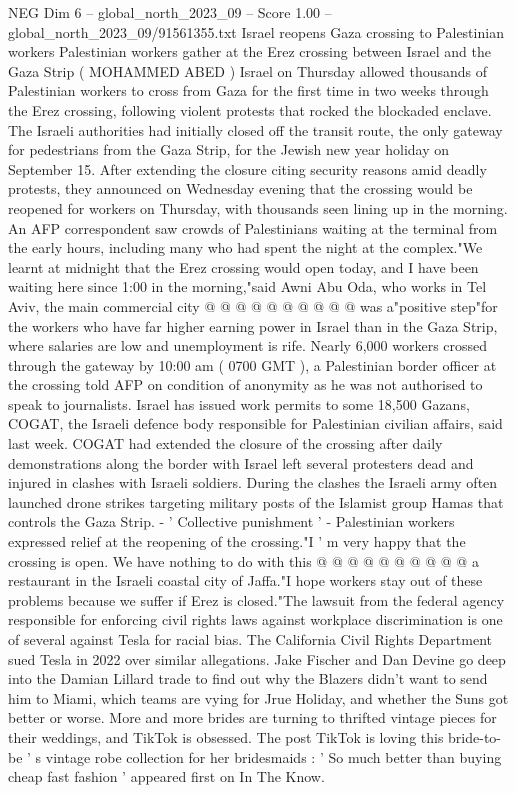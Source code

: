 \begin{textsample}{NEG Dim 6 – global\_north\_2023\_09 – Score 1.00 – global\_north\_2023\_09/91561355.txt}  \label{ex:f6_neg_377}
Israel reopens Gaza crossing to Palestinian workers Palestinian workers gather at the Erez crossing between Israel and the Gaza Strip ( MOHAMMED ABED ) Israel on Thursday allowed thousands of Palestinian workers to cross from Gaza for the first time in two weeks through the Erez crossing, following violent protests that rocked the blockaded enclave.
The Israeli authorities had initially closed off the transit route, the only gateway for pedestrians from the Gaza Strip, for the Jewish new year holiday on September 15.
After extending the closure citing security reasons amid deadly protests, they announced on Wednesday evening that the crossing would be reopened for workers on Thursday, with thousands seen lining up in the morning.
An AFP correspondent saw crowds of Palestinians waiting at the terminal from the early hours, including many who had spent the night at the complex."We learnt at midnight that the Erez crossing would open today, and I have been waiting here since 1:00 in the morning,"said Awni Abu Oda, who works in Tel Aviv, the main commercial city @ @ @ @ @ @ @ @ @ @ was a"positive step"for the workers who have far higher earning power in Israel than in the Gaza Strip, where salaries are low and unemployment is rife.
Nearly 6,000 workers crossed through the gateway by 10:00 am ( 0700 GMT ), a Palestinian border officer at the crossing told AFP on condition of anonymity as he was not authorised to speak to journalists.
Israel has issued work permits to some 18,500 Gazans, COGAT, the Israeli defence body responsible for Palestinian civilian affairs, said last week.
COGAT had extended the closure of the crossing after daily demonstrations along the border with Israel left several protesters dead and injured in clashes with Israeli soldiers.
During the clashes the Israeli army often launched drone strikes targeting military posts of the Islamist group Hamas that controls the Gaza Strip. - ' Collective punishment ' - Palestinian workers expressed relief at the reopening of the crossing."I ' m very happy that the crossing is open.
We have nothing to do with this @ @ @ @ @ @ @ @ @ @ a restaurant in the Israeli coastal city of Jaffa."I hope workers stay out of these problems because we suffer if Erez is closed."The lawsuit from the federal agency responsible for enforcing civil rights laws against workplace discrimination is one of several against Tesla for racial bias.
The California Civil Rights Department sued Tesla in 2022 over similar allegations.
Jake Fischer and Dan Devine go deep into the Damian Lillard trade to find out why the Blazers didn't want to send him to Miami, which teams are vying for Jrue Holiday, and whether the Suns got better or worse.
More and more brides are turning to thrifted vintage pieces for their weddings, and TikTok is obsessed.
The post TikTok is loving this bride-to-be ' s vintage robe collection for her bridesmaids : ' So much better than buying cheap fast fashion ' appeared first on In The Know.

\end{textsample}

